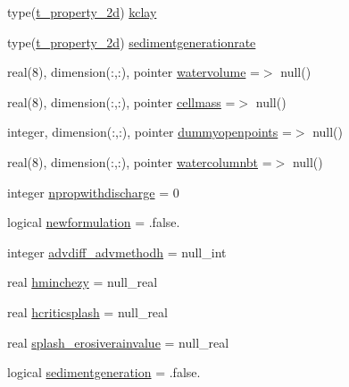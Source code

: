 \begin{DoxyCompactItemize}
\item 
type(\mbox{\hyperlink{structmodulerunoffproperties_1_1t__property__2d}{t\+\_\+property\+\_\+2d}}) \mbox{\hyperlink{structmodulerunoffproperties_1_1t__runoffproperties_a4ca233588800bddc44d1b596909859e3}{kclay}}
\item 
type(\mbox{\hyperlink{structmodulerunoffproperties_1_1t__property__2d}{t\+\_\+property\+\_\+2d}}) \mbox{\hyperlink{structmodulerunoffproperties_1_1t__runoffproperties_a5988706c8cf48959a448c2a76fa7866c}{sedimentgenerationrate}}
\item 
real(8), dimension(\+:,\+:), pointer \mbox{\hyperlink{structmodulerunoffproperties_1_1t__runoffproperties_ae51834099fe21c9d33bdd0edf89c0ce8}{watervolume}} =$>$ null()
\item 
real(8), dimension(\+:,\+:), pointer \mbox{\hyperlink{structmodulerunoffproperties_1_1t__runoffproperties_a55ac39c5e2b5ea0336e7ca432e0739cc}{cellmass}} =$>$ null()
\item 
integer, dimension(\+:,\+:), pointer \mbox{\hyperlink{structmodulerunoffproperties_1_1t__runoffproperties_ac49231c099bdde57782a06fcd4e3ea52}{dummyopenpoints}} =$>$ null()
\item 
real(8), dimension(\+:,\+:), pointer \mbox{\hyperlink{structmodulerunoffproperties_1_1t__runoffproperties_a4c8d9e46f8b2173d86bf16c41e206953}{watercolumnbt}} =$>$ null()
\item 
integer \mbox{\hyperlink{structmodulerunoffproperties_1_1t__runoffproperties_a1fcb3c29d9507b3e8972e8b04cd89689}{npropwithdischarge}} = 0
\item 
logical \mbox{\hyperlink{structmodulerunoffproperties_1_1t__runoffproperties_a068aec2999e07ef65ab102686e5e928d}{newformulation}} = .false.
\item 
integer \mbox{\hyperlink{structmodulerunoffproperties_1_1t__runoffproperties_a388e1a29d51503e1abbdb0441e6538b0}{advdiff\+\_\+advmethodh}} = null\+\_\+int
\item 
real \mbox{\hyperlink{structmodulerunoffproperties_1_1t__runoffproperties_a665997beb4610491ae597cd5fdd97619}{hminchezy}} = null\+\_\+real
\item 
real \mbox{\hyperlink{structmodulerunoffproperties_1_1t__runoffproperties_a3a0e1261a6ac2321804472664f96789e}{hcriticsplash}} = null\+\_\+real
\item 
real \mbox{\hyperlink{structmodulerunoffproperties_1_1t__runoffproperties_af9cabe400f182be182a878acb7bb1d70}{splash\+\_\+erosiverainvalue}} = null\+\_\+real
\item 
logical \mbox{\hyperlink{structmodulerunoffproperties_1_1t__runoffproperties_a74e41779ecc2c233996baa0ad8081521}{sedimentgeneration}} = .false.
\end{DoxyCompactItemize}


